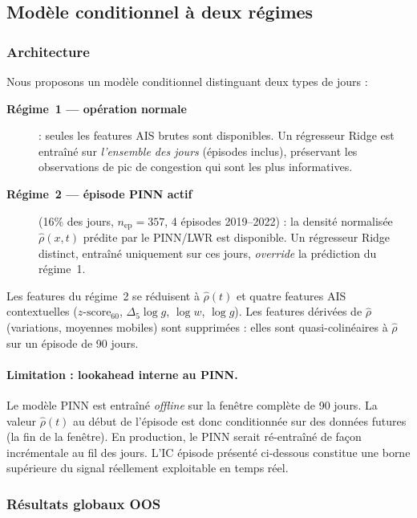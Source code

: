 \bigskip

\subsection{Modèle conditionnel à deux régimes}
\label{sec:two_regime}

\subsubsection{Architecture}

Nous proposons un modèle conditionnel distinguant deux types de jours :

\begin{description}
    \item[\textbf{Régime~1 --- opération normale}] : seules les features AIS
    brutes sont disponibles. Un régresseur Ridge est entraîné sur
    \emph{l'ensemble des jours} (épisodes inclus), préservant les observations
    de pic de congestion qui sont les plus informatives.

    \item[\textbf{Régime~2 --- épisode PINN actif}] (16\% des jours,
    $n_{\text{ep}} = 357$, 4 épisodes 2019--2022) : la densité normalisée
    $\hat{\rho}(x,t)$ prédite par le PINN/LWR est disponible. Un régresseur
    Ridge distinct, entraîné uniquement sur ces jours, \emph{override} la
    prédiction du régime~1.
\end{description}

\noindent
Les features du régime~2 se réduisent à $\hat{\rho}(t)$ et quatre features
AIS contextuelles ($z\text{-score}_{60}$, $\Delta_5 \log g$, $\log w$,
$\log g$). Les features dérivées de $\hat{\rho}$ (variations, moyennes
mobiles) sont supprimées : elles sont quasi-colinéaires à $\hat{\rho}$ sur
un épisode de 90 jours.

\paragraph{Limitation : lookahead interne au PINN.}
Le modèle PINN est entraîné \emph{offline} sur la fenêtre complète de
90 jours. La valeur $\hat{\rho}(t)$ au début de l'épisode est donc
conditionnée sur des données futures (la fin de la fenêtre). En production,
le PINN serait ré-entraîné de façon incrémentale au fil des jours. L'IC
épisode présenté ci-dessous constitue une borne supérieure du signal
réellement exploitable en temps réel.

\subsubsection{Résultats globaux OOS}

